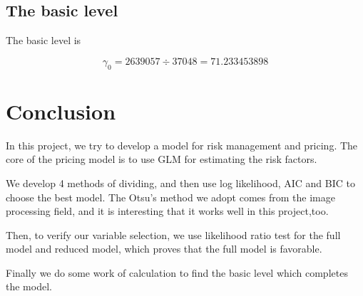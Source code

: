 \documentclass[11pt]{article}
\begin{document}
\subsection{The basic level}

The basic level is

\begin{equation}
	\gamma_0=2639057\div 37048=71.233453898
\end{equation}
\section{Conclusion}

In this project, we try to develop a model for risk management and pricing. The core of the pricing model is to use GLM for estimating the risk factors.

We develop 4 methods of dividing, and then use log likelihood, AIC and BIC to choose the best model. The Otsu's method we adopt comes from the image processing field, and it is interesting that it works well in this project,too.

Then, to verify our variable selection, we use likelihood ratio test for the full model and reduced model, which proves that the full model is favorable.

Finally we do some work of calculation to find the basic level which completes the model.
\end{document}
